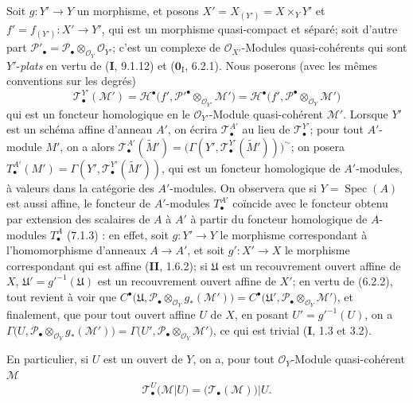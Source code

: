 \begin{env}[7.7.2]
Soit $g:Y'\to Y$ un morphisme, et posons
$X'=X_{(Y')}=X\times_Y Y'$ et $f'=f_{(Y')}:X'\longrightarrow Y'$,
qui est un morphisme quasi-compact et séparé; soit d'autre part
$\mathscr P'_\bullet=\mathscr P_\bullet\otimes_{\mathscr O_Y}\mathscr O_{Y'}$;
c'est un complexe de $\mathscr O_{X'}$-Modules quasi-cohérents qui sont
$Y'$-\emph{plats} en vertu de (\textbf{I}, 9.1.12) et ($\mathbf{0}_{\mathrm I}$, 6.2.1). Nous poserons
(avec les mêmes conventions sur les degrés)
\[
  \mathscr T^{Y'}_\bullet(\mathscr M')
  =\mathscr H^\bullet
    \bigl(f',\mathscr P'^\bullet\otimes_{\mathscr O_{Y'}}\mathscr M'\bigr)
  =\mathscr H^\bullet
    \bigl(f',\mathscr P^\bullet\otimes_{\mathscr O_Y}\mathscr M'\bigr)
  \tag{7.7.2.1}\label{III.7.7.2.1.fr}
\]
qui est un foncteur homologique en le $\mathscr O_{Y'}$-Module quasi-cohérent
$\mathscr M'$. Lorsque $Y'$ est un schéma affine d'anneau $A'$, on écrira
$\mathscr T^{A'}_\bullet$ au lieu de $\mathscr T^{Y'}_\bullet$; pour tout
$A'$-module $M'$, on a alors
$\mathscr T^{A'}_\bullet(\widetilde{M}')=\bigl(\Gamma(Y',\mathscr T^{Y'}_\bullet(\widetilde{M}'))\bigr)^\sim$;
on posera
$T^{A'}_\bullet(M')=\Gamma(Y',\mathscr T^{Y'}_\bullet(\widetilde{M}'))$,
qui est un foncteur homologique de $A'$-modules, à valeurs dans la catégorie des
$A'$-modules.
On observera que si $Y=\operatorname{Spec}(A)$ est aussi affine, le foncteur de
$A'$-modules $T^{A'}_\bullet$ coïncide avec le foncteur obtenu par extension des
scalaires de $A$ à $A'$ à partir du foncteur homologique de $A$-modules
$T^A_\bullet$ (7.1.3) : en effet, soit $g:Y'\to Y$ le morphisme correspondant à
l'homomorphisme d'anneaux $A\to A'$, et soit $g':X'\to X$ le morphisme
correspondant qui est affine (\textbf{II}, 1.6.2); si $\mathfrak U$ est un recouvrement
ouvert affine de $X$, $\mathfrak U'=g'^{-1}(\mathfrak U)$ est un recouvrement
ouvert affine de $X'$; en vertu de (6.2.2), tout revient à voir que
$C^\bullet\bigl(\mathfrak U,\mathscr P_\bullet\otimes_{\mathscr O_Y}g_*(\mathscr M')\bigr)=C^\bullet\bigl(\mathfrak U',\mathscr P_\bullet\otimes_{\mathscr O_Y}\mathscr M'\bigr)$,
et finalement, que pour tout ouvert affine $U$ de $X$, en posant
$U'=g'^{-1}(U)$, on a
$\Gamma\bigl(U,\mathscr P_\bullet\otimes_{\mathscr O_Y}g_*(\mathscr M')\bigr)=\Gamma\bigl(U',\mathscr P_\bullet\otimes_{\mathscr O_Y}\mathscr M'\bigr)$,
ce qui est trivial (\textbf{I}, 1.3 et 3.2).

En particulier, si $U$ est un ouvert de $Y$, on a, pour tout
$\mathscr O_Y$-Module quasi-cohérent $\mathscr M$
\[
  \mathscr T^U_\bullet(\mathscr M|U)
  =\bigl(\mathscr T_\bullet(\mathscr M)\bigr)|U.
  \tag{7.7.2.2}\label{III.7.7.2.2.fr}
\]
\end{env}

